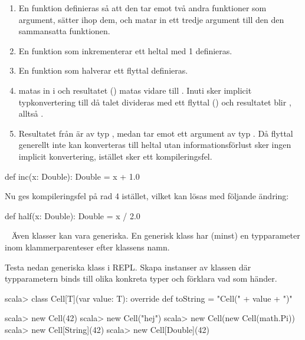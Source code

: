 \SubtaskSolved   \begin{enumerate}
\item En funktion definieras så att den tar emot två andra funktioner som argument, sätter ihop dem, och matar in ett tredje argument till den den sammansatta funktionen.
\item En funktion som inkrementerar ett heltal med 1 definieras.
\item En funktion som halverar ett flyttal definieras.
\item {} matas in i  och resultatet () matas vidare till . Inuti  sker implicit typkonvertering till  då talet divideras med ett flyttal () och resultatet blir , alltså .
\item Resultatet från  är av typ , medan  tar emot ett argument av typ . Då flyttal generellt inte kan konverteras till heltal utan informationsförlust sker ingen implicit konvertering, istället sker ett kompileringsfel.
\end{enumerate}

\SubtaskSolved  \begin{Code}
def inc(x: Double): Double = x + 1.0
\end{Code}
Nu ges kompileringsfel på rad 4 istället, vilket kan lösas med följande ändring:
\begin{Code}
def half(x: Double): Double = x / 2.0
\end{Code}

\QUESTEND





\QUESTBEGIN

\Task  \what~  Även klasser kan vara generiska. En generisk klass har (minst) en typparameter inom klammerparenteser efter klassens namn.

\Subtask Testa nedan generiska klass  i REPL. Skapa instanser av klassen  där typparametern  binds till olika konkreta typer och förklara vad som händer.

\begin{REPL}
scala> class Cell[T](var value: T):
         override def toString = "Cell(" + value + ")"
       
scala> new Cell(42)
scala> new Cell("hej")
scala> new Cell(new Cell(math.Pi))
scala> new Cell[String](42)
scala> new Cell[Double](42)
\end{REPL}

